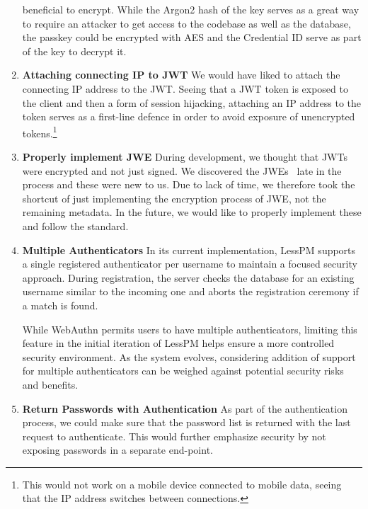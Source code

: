 \begin{enumerate}[label=$\blacktriangleright$]
        beneficial
        to encrypt.
        While the Argon2 hash of the key serves as a great way to require an
        attacker to get access to the codebase as well as the database,
        the passkey could be encrypted with AES and the Credential ID serve
        as part of the key to decrypt it.
        \item \textbf{Attaching connecting IP to JWT}
        \newline We would have liked to attach the connecting IP address to the
        JWT\@.
        Seeing that a JWT token is exposed to the client and then a form of
        session hijacking, attaching an IP address to the token serves as a
        first-line defence in order to avoid exposure of unencrypted
        tokens.\footnote{
            This would not work on a mobile device connected to mobile data,
            seeing that the IP address switches between connections.
        }
        \item \textbf{Properly implement JWE}
        \newline During development, we thought that JWTs were encrypted and
        not just signed.
        We discovered the JWEs~\cite{rfc7516} late in the process and these
        were new to us.
        Due to lack of time, we therefore took the shortcut of just
        implementing the encryption process of JWE, not the remaining metadata.
        In the future, we would like to properly implement these and follow
        the standard.
        \item \textbf{Multiple Authenticators}
        \newline In its current implementation, LessPM supports a single
        registered authenticator per username to maintain a focused security
        approach.
        During registration, the server checks the database for an existing
        username similar to the incoming one and aborts the registration
        ceremony if a match is found.

        While WebAuthn permits users to have multiple authenticators, limiting
        this feature in the initial iteration of LessPM helps ensure a more
        controlled security environment.
        As the system evolves, considering addition of support for multiple
        authenticators can be weighed against potential security risks and
        benefits.
        \item \textbf{Return Passwords with Authentication}
        \newline As part of the authentication process, we could make sure
        that the password list is returned with the last request to
        authenticate.
        This would further emphasize security by not exposing passwords in a
        separate end-point.


\end{enumerate}
